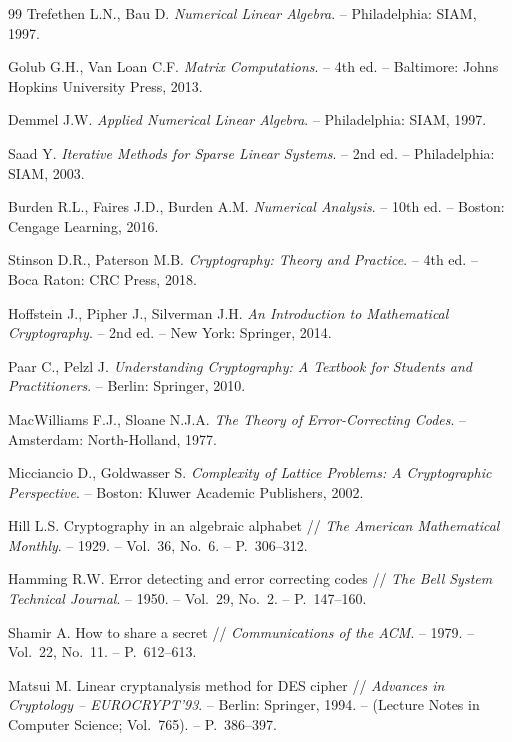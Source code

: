 \begin{thebibliography}{99}
Trefethen L.N., Bau D. \textit{Numerical Linear Algebra}. – Philadelphia:
SIAM, 1997.

Golub G.H., Van Loan C.F. \textit{Matrix Computations}. – 4th ed. –
Baltimore: Johns Hopkins University Press, 2013.

Demmel J.W. \textit{Applied Numerical Linear Algebra}. – Philadelphia:
SIAM, 1997.

Saad Y. \textit{Iterative Methods for Sparse Linear Systems}. – 2nd ed. –
Philadelphia: SIAM, 2003.

Burden R.L., Faires J.D., Burden A.M. \textit{Numerical Analysis}. –
10th ed. – Boston: Cengage Learning, 2016.

Stinson D.R., Paterson M.B. \textit{Cryptography: Theory and Practice}. –
4th ed. – Boca Raton: CRC Press, 2018.

Hoffstein J., Pipher J., Silverman J.H. \textit{An Introduction to
Mathematical Cryptography}. – 2nd ed. – New York: Springer, 2014.

Paar C., Pelzl J. \textit{Understanding Cryptography: A Textbook for Students
and Practitioners}. – Berlin: Springer, 2010.

MacWilliams F.J., Sloane N.J.A. \textit{The Theory of Error-Correcting Codes}. –
Amsterdam: North-Holland, 1977.

Micciancio D., Goldwasser S. \textit{Complexity of Lattice Problems:
A Cryptographic Perspective}. – Boston: Kluwer Academic Publishers, 2002.

Hill L.S. Cryptography in an algebraic alphabet // \textit{The American
Mathematical Monthly}. – 1929. – Vol.~36, No.~6. – P.~306–312.

Hamming R.W. Error detecting and error correcting codes // \textit{The Bell
System Technical Journal}. – 1950. – Vol.~29, No.~2. – P.~147–160.

Shamir A. How to share a secret // \textit{Communications of the ACM}. –
1979. – Vol.~22, No.~11. – P.~612–613.

Matsui M. Linear cryptanalysis method for DES cipher // \textit{Advances in
Cryptology – EUROCRYPT’93}. – Berlin: Springer, 1994. – (Lecture Notes in
Computer Science; Vol.~765). – P.~386–397.


\end{thebibliography}
